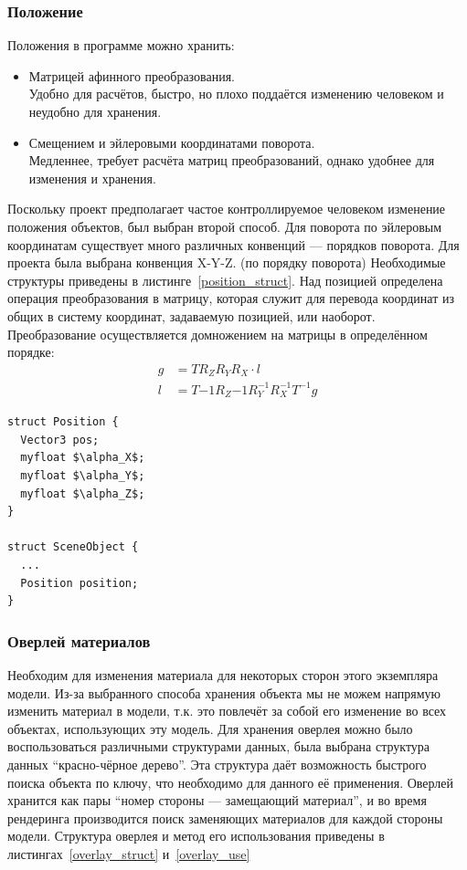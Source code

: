 \documentclass[a4paper,12pt]{report}
\numberwithin{equation}{section}
\begin{document}
\subsubsection{Положение}
Положения в программе можно хранить:
\begin{itemize}
\item Матрицей афинного преобразования. \\
Удобно для расчётов, быстро, но плохо поддаётся изменению человеком и неудобно для хранения.
\item Смещением и эйлеровыми координатами поворота. \\
Медленнее, требует расчёта матриц преобразований, однако удобнее для изменения и хранения.
\end{itemize}
Поскольку проект предполагает частое контроллируемое человеком изменение положения объектов, был выбран второй способ. Для поворота по эйлеровым координатам существует много различных конвенций --- порядков поворота. Для проекта была выбрана конвенция X-Y-Z. (по порядку поворота) Необходимые структуры приведены в листинге~\ref{position_struct}. Над позицией определена операция преобразования в матрицу, которая служит для перевода координат из общих в систему координат, задаваемую позицией, или наоборот. Преобразование осуществляется домножением на матрицы в определённом порядке:
\begin{align}
g &= T R_Z R_Y R_X \cdot l \\
l &= T{-1} R_Z{-1} R_Y^{-1} R_X^{-1} T^{-1} g
\end{align}
\begin{lstlisting}[float=p,caption={Структура данных ``Позиция''},label=position_struct]
struct Position {
  Vector3 pos;
  myfloat $\alpha_X$;
  myfloat $\alpha_Y$;
  myfloat $\alpha_Z$;
}

struct SceneObject {
  ...
  Position position;
}
\end{lstlisting}

\subsubsection{Оверлей материалов}
Необходим для изменения материала для некоторых сторон этого экземпляра модели. Из-за выбранного способа хранения объекта мы не можем напрямую изменить материал в модели, т.к. это повлечёт за собой его изменение во всех объектах, использующих эту модель. Для хранения оверлея можно было воспользоваться различными структурами данных, была выбрана структура данных ``красно-чёрное дерево''. Эта структура даёт возможность быстрого поиска объекта по ключу, что необходимо для данного её применения. Оверлей хранится как пары ``номер стороны --- замещающий материал'', и во время рендеринга производится поиск заменяющих материалов для каждой стороны модели. Структура оверлея и метод его использования приведены в листингах~\ref{overlay_struct} и~\ref{overlay_use}
\end{document}

